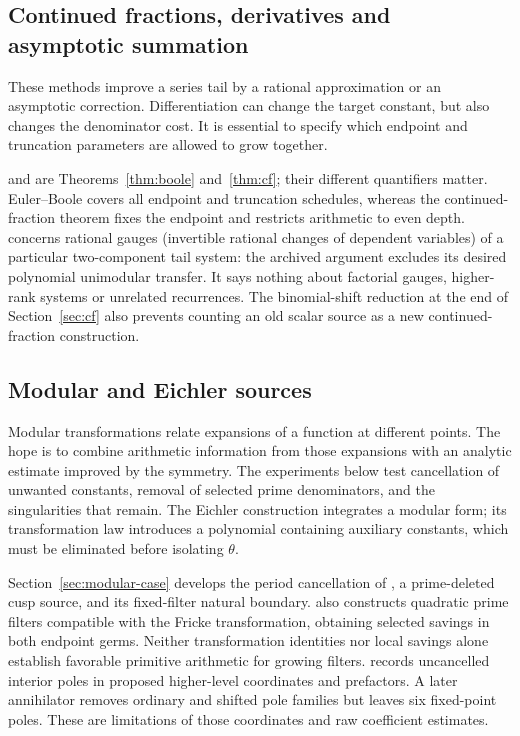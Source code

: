 \subsection{Continued fractions, derivatives and asymptotic summation}
These methods improve a series tail by a rational approximation or an
asymptotic correction. Differentiation can change the target constant,
but also changes the denominator cost. It is essential to specify which
endpoint and truncation parameters are allowed to grow together.

 and  are Theorems~\ref{thm:boole} and~\ref{thm:cf}; their
different quantifiers matter. Euler--Boole covers all endpoint and
truncation schedules, whereas the continued-fraction theorem fixes the
endpoint and restricts arithmetic to even depth.  concerns rational
gauges (invertible rational changes of dependent variables) of a
particular two-component tail system: the archived argument
excludes its desired polynomial unimodular transfer. It says nothing
about factorial gauges, higher-rank systems or unrelated recurrences.
The binomial-shift reduction at the end of Section~\ref{sec:cf}
also prevents counting an old scalar source as a new continued-fraction
construction.

\subsection{Modular and Eichler sources}
Modular transformations relate expansions of a function at different
points. The hope is to combine arithmetic information from those
expansions with an analytic estimate improved by the symmetry.
The experiments below test cancellation of unwanted constants, removal
of selected prime denominators, and the singularities that remain.
The Eichler construction integrates a modular form; its transformation
law introduces a polynomial containing auxiliary constants, which
must be eliminated before isolating $\theta$.

Section~\ref{sec:modular-case} develops the period cancellation of
, a prime-deleted cusp source, and its fixed-filter natural
boundary.  also constructs quadratic prime filters
compatible with the Fricke transformation, obtaining selected savings
in both endpoint germs. Neither transformation identities nor local
savings alone establish favorable primitive arithmetic for growing
filters.  records uncancelled interior poles in proposed higher-level
coordinates and prefactors. A later annihilator removes ordinary and
shifted pole families but leaves six fixed-point poles. These are
limitations of those coordinates and raw coefficient estimates.

